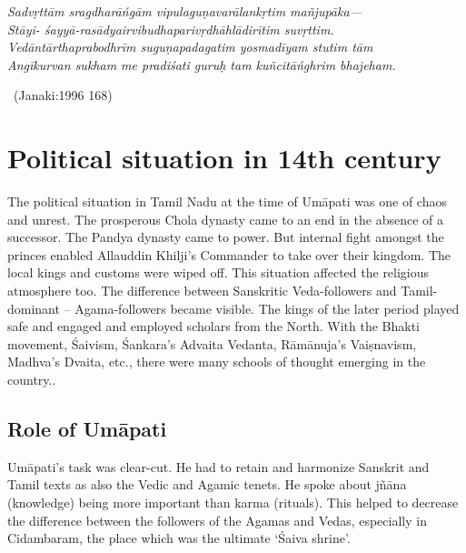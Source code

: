 \begin{myquote}
\textit{Sadvṛttām sragdharāńgām vipulaguṇavarālankṛtim mañjupāka—}\\\textit{Stāyi- śayyā-rasādyairvibudhaparivṛdhāhlādirītim suvṛttim.}\\\textit{Vedāntārthaprabodhrīm suguṇapadagatim yosmadīyam stutim tām}\\\textit{Angīkurvan sukham me pradiśati guruḥ tam kuñcitāńghrim bhajeham.}

~\hfill (Janaki:1996 168)
\end{myquote}

\newpage


\section{Political situation in 14th century}

\vskip -4pt

The political situation in Tamil Nadu at the time of Umāpati was one of chaos and unrest. The prosperous Chola dynasty came to an end in the absence of a successor. The Pandya dynasty came to power. But internal fight amongst the princes enabled Allauddin Khilji’s Commander to take over their kingdom. The local kings and customs were wiped off. This situation affected the religious atmosphere too. The difference between Sanskritic Veda-followers and Tamil-dominant – Agama-followers became visible. The kings of the later period played safe and engaged and employed scholars from the North. With the Bhakti movement, Śaivism, Śankara’s Advaita Vedanta, Rāmānuja’s Vaiṣnavism, Madhva’s Dvaita, etc., there were many schools of thought emerging in the country..

\subsection{Role of Umāpati}

\vskip -4pt

Umāpati’s task was clear-cut. He had to retain and harmonize Sanskrit and Tamil texts as also the Vedic and Agamic tenets. He spoke about jñāna (knowledge) being more important than karma (rituals). This helped to decrease the difference between the followers of the Agamas and Vedas, especially in Cidambaram, the place which was the ultimate ‘Śaiva shrine’.

